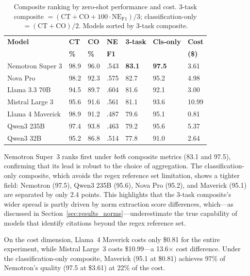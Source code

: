 \documentclass[11pt,a4paper]{article}
\begin{document}
\begin{table}[t]
\centering
\caption{Composite ranking by zero-shot performance and cost. 3-task composite $= (\text{CT} + \text{CO} + 100 \cdot \text{NE}_{\text{F1}}) / 3$; classification-only $= (\text{CT} + \text{CO})/2$. Models sorted by 3-task composite.}
\label{tab:composite}
\small
\begin{tabular}{lR{1.1cm}R{1.1cm}R{1.0cm}R{1.2cm}R{1.2cm}R{1.2cm}}
\toprule
\textbf{Model} & \textbf{CT} & \textbf{CO} & \textbf{NE} & \textbf{3-task} & \textbf{Cls-only} & \textbf{Cost} \\
 & \textbf{\%} & \textbf{\%} & \textbf{F1} & & & \textbf{(\$)} \\
\midrule
Nemotron Super 3  & 98.9 & 96.0 & .543 & \textbf{83.1} & \textbf{97.5} & 3.61 \\
Nova Pro          & 98.2 & 92.3 & .575 & 82.7 & 95.2 & 4.98 \\
Llama 3.3 70B     & 94.5 & 89.7 & .604 & 81.6 & 92.1 & 3.00 \\
Mistral Large 3   & 95.6 & 91.6 & .561 & 81.1 & 93.6 & 10.99 \\
Llama 4 Maverick  & 98.9 & 91.2 & .487 & 79.6 & 95.1 & 0.81 \\
Qwen3 235B        & 97.4 & 93.8 & .463 & 79.2 & 95.6 & 5.37 \\
Qwen3 32B         & 95.2 & 86.8 & .514 & 77.8 & 91.0 & 2.64 \\
\bottomrule
\end{tabular}
\end{table}

Nemotron Super~3 ranks first under \emph{both} composite metrics (83.1 and 97.5), confirming that its lead is robust to the choice of aggregation. The classification-only composite, which avoids the regex reference set limitation, shows a tighter field: Nemotron (97.5), Qwen3 235B (95.6), Nova Pro (95.2), and Maverick (95.1) are separated by only 2.4 points. This highlights that the 3-task composite's wider spread is partly driven by norm extraction score differences, which---as discussed in Section~\ref{sec:results_norms}---underestimate the true capability of models that identify citations beyond the regex reference set.

On the cost dimension, Llama~4 Maverick costs only \$0.81 for the entire experiment, while Mistral Large~3 costs \$10.99---a 13.6$\times$ cost difference. Under the classification-only composite, Maverick (95.1 at \$0.81) achieves 97\% of Nemotron's quality (97.5 at \$3.61) at 22\% of the cost.
\end{document}
